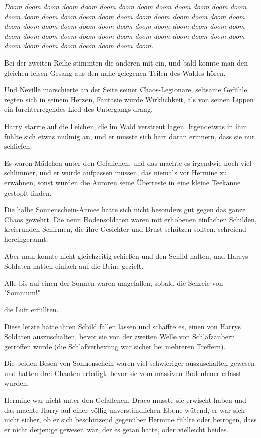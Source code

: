 {\emph{Doom doom doom doom doom doom doom doom doom doom doom doom doom doom doom doom doom doom doom doom doom doom doom doom doom doom doom doom doom doom doom doom doom doom doom doom doom doom doom doom doom doom doom doom doom doom doom doom doom doom doom doom doom doom doom doom doom doom doom doom.}

Bei der zweiten Reihe stimmten die anderen mit ein, und bald konnte man den gleichen leisen Gesang aus den nahe gelegenen Teilen des Waldes hören.

Und Neville marschierte an der Seite seiner Chaos-Legionäre, seltsame Gefühle regten sich in seinem Herzen, Fantasie wurde Wirklichkeit, als von seinen Lippen ein furchterregendes Lied des Untergangs drang.

Harry starrte auf die Leichen, die im Wald verstreut lagen. Irgendetwas in ihm fühlte sich etwas mulmig an, und er musste sich hart daran erinnern, dass sie nur schliefen.

Es waren Mädchen unter den Gefallenen, und das machte es irgendwie noch viel schlimmer, und er würde aufpassen müssen, das niemals vor Hermine zu erwähnen, sonst würden die Auroren seine Überreste in eine kleine Teekanne gestopft finden.

Die halbe Sonnenschein-Armee hatte sich nicht besonders gut gegen das ganze Chaos gewehrt. Die neun Bodensoldaten waren mit erhobenen einfachen Schilden, kreisrunden Schirmen, die ihre Gesichter und Brust schützen sollten, schreiend hereingerannt.

Aber man konnte nicht gleichzeitig schießen und den Schild halten, und Harrys Soldaten hatten einfach auf die Beine gezielt.

Alle bis auf einen der Sonnen waren umgefallen, sobald die Schreie von "Somnium!"

die Luft erfüllten.

Diese letzte hatte ihren Schild fallen lassen und schaffte es, einen von Harrys Soldaten auszuschalten, bevor sie von der zweiten Welle von Schlafzaubern getroffen wurde (die Schlafverhexung war sicher bei mehreren Treffern).

Die beiden Besen von Sonnenschein waren viel schwieriger auszuschalten gewesen und hatten drei Chaoten erledigt, bevor sie vom massiven Bodenfeuer erfasst wurden.

Hermine war nicht unter den Gefallenen. Draco musste sie erwischt haben und das machte Harry auf einer völlig unverständlichen Ebene wütend, er war sich nicht sicher, ob er sich beschützend gegenüber Hermine fühlte oder betrogen, dass er nicht derjenige gewesen war, der es getan hatte, oder vielleicht beides.

}
